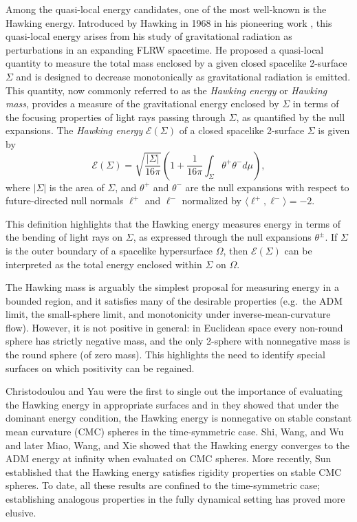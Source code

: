 \documentclass[12pt,a4paper]{amsart}
\theoremstyle{plain}
\theoremstyle{definition}
\begin{document}
Among the quasi-local energy candidates, one of the most well-known is the Hawking energy. Introduced by Hawking in 1968 in his pioneering work \cite{Hawma}, this quasi-local energy arises from his study of gravitational radiation as perturbations in an expanding FLRW spacetime. He proposed a quasi-local quantity to measure the total mass  enclosed by a given closed spacelike 2-surface $\Sigma$ and is designed to decrease monotonically as gravitational radiation is emitted.  This quantity, now commonly referred to as the \emph{Hawking energy} or \emph{Hawking mass}, provides a measure of the gravitational energy enclosed by $\Sigma$ in terms of the focusing properties of light rays passing through $\Sigma$, as quantified by the null expansions. The \emph{Hawking energy} \( \mathcal{E}(\Sigma) \) of a closed spacelike 2-surface \( \Sigma \) is given by
\begin{equation}\label{Hawkingene}
     \mathcal{E}(\Sigma) = \sqrt{\frac{|\Sigma|}{16 \pi}} \left( 1+ \frac{1}{16 \pi} \int_\Sigma \theta^+ \theta^- d\mu \right),
\end{equation} 
where $|\Sigma|$ is the area of $\Sigma$, and $\theta^+$ and $\theta^-$ are the null expansions with respect to future-directed null normals $\ell^+$ and $\ell^-$ normalized by $\langle \ell^+,\ell^-\rangle=-2$.

This definition highlights that the Hawking energy measures energy in terms of the bending of light rays on \( \Sigma \), as expressed through the null expansions \( \theta^\pm \). If \( \Sigma \) is the outer boundary of a spacelike hypersurface \( \Omega \), then \(  \mathcal{E}(\Sigma) \) can be interpreted as the total energy enclosed within \( \Sigma \) on \( \Omega \).





The Hawking mass is arguably the simplest proposal for measuring energy in a bounded region, and it satisfies many of the desirable properties (e.g.\ the ADM limit, the small-sphere limit, and monotonicity under inverse-mean-curvature flow). However, it is not positive in general: in Euclidean space every non-round sphere has strictly negative mass, and the only 2-sphere with nonnegative mass is the round sphere (of zero mass). This highlights the need to identify special surfaces on which positivity can be regained.


Christodoulou and Yau were the first to single out the importance of evaluating the Hawking energy in appropriate surfaces and in \cite{Chriyau} they showed that under the dominant energy condition, the Hawking energy is nonnegative on stable constant mean curvature (CMC) spheres in the time-symmetric case.  Shi, Wang,  and Wu  \cite{shi2009behavior} and later Miao, Wang, and Xie \cite{Miao} showed that the Hawking energy converges to the  ADM energy at infinity when evaluated on CMC spheres. More recently, Sun \cite{sun2017rigidity} established that the Hawking energy satisfies rigidity properties on stable CMC spheres. To date, all these results are confined to the time-symmetric case; establishing analogous properties in the fully dynamical setting has proved more elusive.
\end{document}
